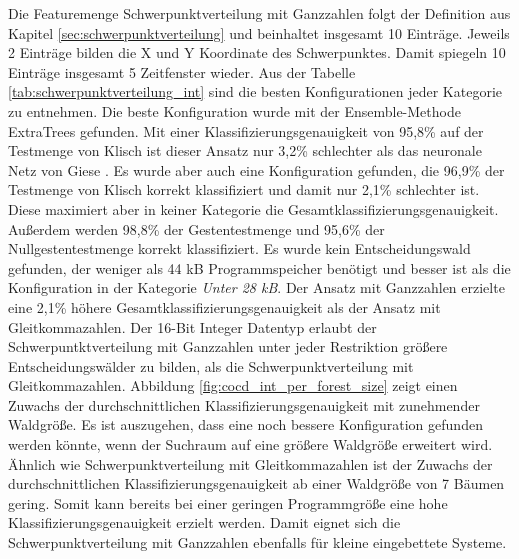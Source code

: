 Die Featuremenge Schwerpunktverteilung mit Ganzzahlen folgt der Definition aus Kapitel \ref{sec:schwerpunktverteilung} und beinhaltet insgesamt 10 Einträge. Jeweils 2 Einträge bilden die X und Y
Koordinate des Schwerpunktes. Damit spiegeln 10 Einträge insgesamt 5 Zeitfenster wieder.
\newline
\newline
Aus der Tabelle \ref{tab:schwerpunktverteilung_int} sind die besten Konfigurationen jeder Kategorie zu entnehmen. Die beste Konfiguration wurde mit der Ensemble-Methode ExtraTrees gefunden.
Mit einer Klassifizierungsgenauigkeit von 95,8\% auf der Testmenge von Klisch ist dieser Ansatz nur 3,2\% schlechter als das neuronale Netz von Giese \cite{gieseThesis}. Es wurde aber auch eine Konfiguration
gefunden, die 96,9\% der Testmenge von Klisch korrekt klassifiziert und damit nur 2,1\% schlechter ist. Diese maximiert aber in keiner Kategorie die Gesamtklassifizierungsgenauigkeit.
Außerdem werden 98,8\% der Gestentestmenge und 95,6\% der Nullgestentestmenge korrekt klassifiziert. Es wurde kein Entscheidungswald gefunden, der weniger als 44 kB Programmspeicher benötigt und besser ist als die
Konfiguration in der Kategorie \textit{Unter 28 kB}.
\newline
\newline
Der Ansatz mit Ganzzahlen erzielte eine 2,1\% höhere Gesamtklassifizierungsgenauigkeit als der Ansatz mit Gleitkommazahlen. Der 16-Bit Integer Datentyp erlaubt der Schwerpuntktverteilung mit Ganzzahlen unter jeder
Restriktion größere Entscheidungswälder zu bilden, als die Schwerpunktverteilung mit Gleitkommazahlen. Abbildung \ref{fig:cocd_int_per_forest_size} zeigt einen Zuwachs der durchschnittlichen Klassifizierungsgenauigkeit
mit zunehmender Waldgröße. Es ist auszugehen, dass eine noch bessere Konfiguration gefunden werden könnte, wenn der Suchraum auf eine größere Waldgröße erweitert wird. Ähnlich wie Schwerpunktverteilung mit
Gleitkommazahlen ist der Zuwachs der durchschnittlichen Klassifizierungsgenauigkeit ab einer Waldgröße von 7 Bäumen gering. Somit kann bereits bei einer geringen Programmgröße eine hohe Klassifizierungsgenauigkeit
erzielt werden. Damit eignet sich die Schwerpunktverteilung mit Ganzzahlen ebenfalls für kleine eingebettete Systeme.
